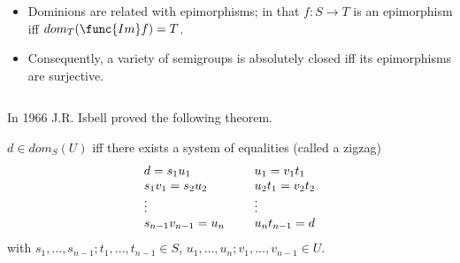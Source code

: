 \documentclass[notes=show]{beamer}
\newenvironment{stepitemize}{\begin{itemize}[<+->]}{\end{itemize} }
\begin{document}
\begin{frame}%


\begin{stepitemize}
\item Dominions are related with epimorphisms; in that $f:S\longrightarrow T$
is an epimorphism iff $dom_{T}(\func{Im}f)=T$.\bigskip

\item Consequently, a variety of semigroups is absolutely closed iff its
epimorphisms are surjective.
\end{stepitemize}

\begin{equation*}
\end{equation*}

\transboxout%
\end{frame}%

\begin{frame}%


In 1966 J.R. Isbell proved the following theorem.

\begin{theorem}
$d\in dom_{S}(U)$ iff there exists a system of equalities (called a zigzag)%
\begin{equation*}
\begin{tabular}{lll}
$d=s_{1}u_{1}$ &  & $u_{1}=v_{1}t_{1}$ \\ 
$s_{1}v_{1}=s_{2}u_{2}$ &  & $u_{2}t_{1}=v_{2}t_{2}$ \\ 
$\vdots $ &  & $\vdots $ \\ 
$s_{n-1}v_{n-1}=u_{n}$ &  & $u_{n}t_{n-1}=d$%
\end{tabular}%
\end{equation*}%
with $s_{1},\ldots ,s_{n-1};t_{1},\ldots ,t_{n-1}\in S$, $u_{1},\ldots
,u_{n};v_{1},\ldots ,v_{n-1}\in U$.
\end{theorem}

\begin{equation*}
\end{equation*}

\transboxout%
\end{frame}%
\end{document}
